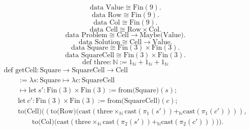 \documentclass[11pt]{article}
\begin{document}
\begin{equation}
	\text{data Value} \cong \text{Fin}(9).
\end{equation}
\begin{equation}
	\text{data Row} \cong \text{Fin}(9).
\end{equation}
\begin{equation}
	\text{data Col} \cong \text{Fin}(9).
\end{equation}
\begin{equation}
	\text{data Cell} \cong \text{Row} \times \text{Col}.
\end{equation}
\begin{equation}
	\text{data Problem} \cong \text{Cell} \to \text{Maybe(Value)}.
\end{equation}
\begin{equation}
	\text{data Solution} \cong \text{Cell} \to \text{Value}.
\end{equation}
\begin{equation}
	\text{data Square} \cong \text{Fin}(3) \times \text{Fin}(3).
\end{equation}
\begin{equation}
	\text{data SquareCell} \cong \text{Fin}(3) \times \text{Fin}(3).
\end{equation}
\begin{equation}
	\text{def three} : \mathbb{N} := 1_{\mathbb{N}} + 1_{\mathbb{N}} + 1_{\mathbb{N}}
\end{equation}
\begin{equation}
	\begin{array}{l}
		\text{def getCell} : \text{Square} \to \text{SquareCell} \to \text{Cell} \\
		\qquad := \lambda s : \text{Square} \mapsto \lambda c : \text{SquareCell} \\
		\qquad \mapsto \text{let}\ s' : \text{Fin}(3) \times \text{Fin}(3) := \text{from(Square)}(s); \\
		\qquad \text{let}\ c' : \text{Fin}(3) \times \text{Fin}(3) := \text{from(SquareCell)}(c); \\
		\qquad \text{to(Cell)}((\text{to(Row)(cast}(\text{three} \times_{\mathbb{N}} \text{cast}(\pi_1(s')) +_{\mathbb{N}} \text{cast}(\pi_1(c')))), \\
		\qquad\qquad
		\text{to(Col)(cast}(\text{three} \times_{\mathbb{N}} \text{cast}(\pi_2(s')) +_{\mathbb{N}} \text{cast}(\pi_2(c'))))).
	\end{array}
\end{equation}
\end{document}
